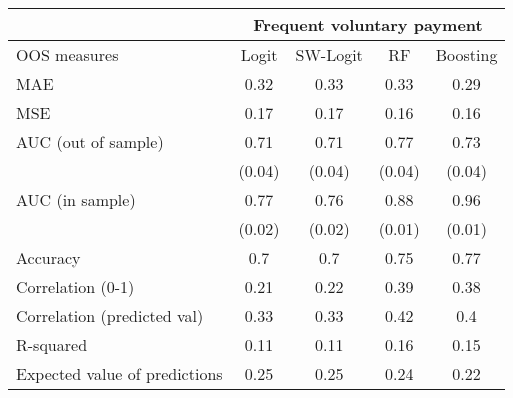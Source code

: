 \begin{tabular}{lcccc}
\toprule
      & \multicolumn{4}{c}{Frequent voluntary payment } \\
\midrule
\midrule
OOS measures & Logit & SW-Logit & RF    & Boosting \\
\midrule
\midrule
MAE   & 0.32  & 0.33  & 0.33  & 0.29 \\
MSE   & 0.17  & 0.17  & 0.16  & 0.16 \\
AUC (out of sample) & 0.71  & 0.71  & 0.77  & 0.73 \\
      & (0.04) & (0.04) & (0.04) & (0.04) \\
AUC (in sample) & 0.77  & 0.76  & 0.88  & 0.96 \\
      & (0.02) & (0.02) & (0.01) & (0.01) \\
Accuracy & 0.7   & 0.7   & 0.75  & 0.77 \\
Correlation (0-1) & 0.21  & 0.22  & 0.39  & 0.38 \\
Correlation (predicted val) & 0.33  & 0.33  & 0.42  & 0.4 \\
R-squared  & 0.11  & 0.11  & 0.16  & 0.15 \\
Expected value of predictions & 0.25  & 0.25  & 0.24  & 0.22 \\
\bottomrule
\bottomrule
\end{tabular}%
